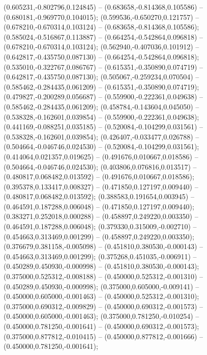  (0.605231,-0.802796,0.124845) -- (0.683658,-0.814368,0.105586) -- (0.680181,-0.969770,0.104015);
 (0.599536,-0.650270,0.121757) -- (0.678210,-0.670314,0.103124) -- (0.683658,-0.814368,0.105586);
 (0.585024,-0.516867,0.113887) -- (0.664254,-0.542864,0.096818) -- (0.678210,-0.670314,0.103124);
 (0.562940,-0.407036,0.101912) -- (0.642817,-0.435750,0.087130) -- (0.664254,-0.542864,0.096818);
 (0.535010,-0.322767,0.086767) -- (0.615351,-0.350890,0.074719) -- (0.642817,-0.435750,0.087130);
 (0.505067,-0.259234,0.070504) -- (0.585462,-0.284435,0.061209) -- (0.615351,-0.350890,0.074719);
 (0.479827,-0.200289,0.056687) -- (0.559900,-0.222361,0.049638) -- (0.585462,-0.284435,0.061209);
 (0.458784,-0.143604,0.045050) -- (0.538328,-0.162601,0.039854) -- (0.559900,-0.222361,0.049638);
 (0.441169,-0.088251,0.035185) -- (0.520084,-0.104299,0.031561) -- (0.538328,-0.162601,0.039854);
 (0.426407,-0.033477,0.026788) -- (0.504664,-0.046746,0.024530) -- (0.520084,-0.104299,0.031561);
 (0.414064,0.021357,0.019625) -- (0.491676,0.010667,0.018586) -- (0.504664,-0.046746,0.024530);
 (0.403806,0.076816,0.013517) -- (0.480817,0.068482,0.013592) -- (0.491676,0.010667,0.018586);
 (0.395378,0.133417,0.008327) -- (0.471850,0.127197,0.009440) -- (0.480817,0.068482,0.013592);
 (0.388583,0.191654,0.003945) -- (0.464591,0.187288,0.006048) -- (0.471850,0.127197,0.009440);
 (0.383271,0.252018,0.000288) -- (0.458897,0.249220,0.003350) -- (0.464591,0.187288,0.006048);
 (0.379330,0.315009,-0.002710) -- (0.454663,0.313469,0.001299) -- (0.458897,0.249220,0.003350);
 (0.376679,0.381158,-0.005098) -- (0.451810,0.380530,-0.000143) -- (0.454663,0.313469,0.001299);
 (0.375268,0.451035,-0.006911) -- (0.450289,0.450930,-0.000998) -- (0.451810,0.380530,-0.000143);
 (0.375000,0.525312,-0.008188) -- (0.450000,0.525312,-0.001310) -- (0.450289,0.450930,-0.000998);
 (0.375000,0.605000,-0.009141) -- (0.450000,0.605000,-0.001463) -- (0.450000,0.525312,-0.001310);
 (0.375000,0.690312,-0.009829) -- (0.450000,0.690312,-0.001573) -- (0.450000,0.605000,-0.001463);
 (0.375000,0.781250,-0.010254) -- (0.450000,0.781250,-0.001641) -- (0.450000,0.690312,-0.001573);
 (0.375000,0.877812,-0.010415) -- (0.450000,0.877812,-0.001666) -- (0.450000,0.781250,-0.001641);

